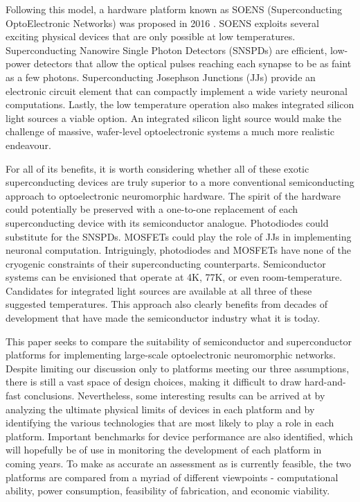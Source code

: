 \documentclass{article}
\begin{document}
Following this model, a hardware platform known as SOENS (Superconducting OptoElectronic Networks) was proposed in 2016 \cite{shainline2017superconducting}. SOENS exploits several exciting physical devices that are only possible at low temperatures. Superconducting Nanowire Single Photon Detectors (SNSPDs) are efficient, low-power detectors that allow the optical pulses reaching each synapse to be as faint as a few photons. Superconducting Josephson Junctions (JJs) provide an electronic circuit element that can compactly implement a wide variety neuronal computations. Lastly, the low temperature operation also makes integrated silicon light sources a viable option. An integrated silicon light source would make the challenge of massive, wafer-level optoelectronic systems a much more realistic endeavour. 

For all of its benefits, it is worth considering whether all of these exotic superconducting devices are truly superior to a more conventional semiconducting approach to optoelectronic neuromorphic hardware. The spirit of the hardware could potentially be preserved with a one-to-one replacement of each superconducting device with its semiconductor analogue. Photodiodes could substitute for the SNSPDs. MOSFETs could play the role of JJs in implementing neuronal computation. Intriguingly, photodiodes and MOSFETs have none of the cryogenic constraints of their superconducting counterparts. Semiconductor systems can be envisioned that operate at 4K, 77K, or even room-temperature. Candidates for integrated light sources are available at all three of these suggested temperatures. This approach also clearly benefits from decades of development that have made the semiconductor industry what it is today.

This paper seeks to compare the suitability of semiconductor and superconductor platforms for implementing large-scale optoelectronic neuromorphic networks. Despite limiting our discussion only to platforms meeting our three assumptions, there is still a vast space of design choices, making it difficult to draw hard-and-fast conclusions. Nevertheless, some interesting results can be arrived at by analyzing the ultimate physical limits of devices in each platform and by identifying the various technologies that are most likely to play a role in each platform. Important benchmarks for device performance are also identified, which will hopefully be of use in monitoring the development of each platform in coming years. To make as accurate an assessment as is currently feasible, the two platforms are compared from a myriad of different viewpoints - computational ability, power consumption, feasibility of fabrication, and economic viability. 
\end{document}
